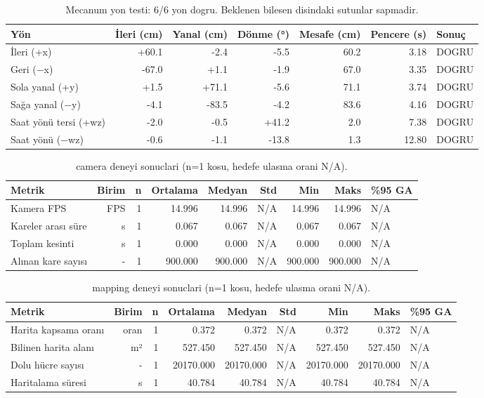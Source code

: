 
\begin{table}[htbp]
\centering
\caption{Mecanum yon testi: 6/6 yon dogru. Beklenen bilesen disindaki sutunlar sapmadir.}
\label{tab:benchmark-mecanum}
\begin{tabular}{lrrrrrl}
\toprule
Yön & İleri (cm) & Yanal (cm) & Dönme (°) & Mesafe (cm) & Pencere (s) & Sonuç \\
\midrule
İleri (+x) & +60.1 & -2.4 & -5.5 & 60.2 & 3.18 & DOGRU \\
Geri (−x) & -67.0 & +1.1 & -1.9 & 67.0 & 3.35 & DOGRU \\
Sola yanal (+y) & +1.5 & +71.1 & -5.6 & 71.1 & 3.74 & DOGRU \\
Sağa yanal (−y) & -4.1 & -83.5 & -4.2 & 83.6 & 4.16 & DOGRU \\
Saat yönü tersi (+wz) & -2.0 & -0.5 & +41.2 & 2.0 & 7.38 & DOGRU \\
Saat yönü (−wz) & -0.6 & -1.1 & -13.8 & 1.3 & 12.80 & DOGRU \\
\bottomrule
\end{tabular}
\end{table}

\begin{table}[htbp]
\centering
\caption{camera deneyi sonuclari (n=1 kosu, hedefe ulasma orani N/A).}
\label{tab:benchmark-camera}
\begin{tabular}{lrrrrrrrl}
\toprule
Metrik & Birim & n & Ortalama & Medyan & Std & Min & Maks & \%95 GA \\
\midrule
Kamera FPS & FPS & 1 & 14.996 & 14.996 & N/A & 14.996 & 14.996 & N/A \\
Kareler arası süre & s & 1 & 0.067 & 0.067 & N/A & 0.067 & 0.067 & N/A \\
Toplam kesinti & s & 1 & 0.000 & 0.000 & N/A & 0.000 & 0.000 & N/A \\
Alınan kare sayısı & - & 1 & 900.000 & 900.000 & N/A & 900.000 & 900.000 & N/A \\
\bottomrule
\end{tabular}
\end{table}

\begin{table}[htbp]
\centering
\caption{mapping deneyi sonuclari (n=1 kosu, hedefe ulasma orani N/A).}
\label{tab:benchmark-mapping}
\begin{tabular}{lrrrrrrrl}
\toprule
Metrik & Birim & n & Ortalama & Medyan & Std & Min & Maks & \%95 GA \\
\midrule
Harita kapsama oranı & oran & 1 & 0.372 & 0.372 & N/A & 0.372 & 0.372 & N/A \\
Bilinen harita alanı & m² & 1 & 527.450 & 527.450 & N/A & 527.450 & 527.450 & N/A \\
Dolu hücre sayısı & - & 1 & 20170.000 & 20170.000 & N/A & 20170.000 & 20170.000 & N/A \\
Haritalama süresi & s & 1 & 40.784 & 40.784 & N/A & 40.784 & 40.784 & N/A \\
\bottomrule
\end{tabular}
\end{table}

